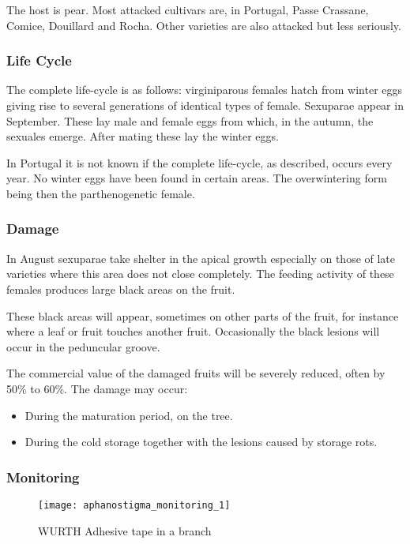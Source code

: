  The host is pear. Most attacked cultivars are, in Portugal, Passe Crassane, Comice, Douillard and Rocha. Other varieties are also attacked but less seriously.

\subsubsection{Life Cycle}

The complete life-cycle is as follows: virginiparous females hatch from winter eggs giving rise to several generations of identical types of female. Sexuparae appear in September. These lay male and female eggs from which, in the autumn, the sexuales emerge. After mating these lay the winter eggs.

In Portugal it is not known if the complete life-cycle, as described, occurs every year. No winter eggs have been found in certain areas. The overwintering form being then the parthenogenetic female.

\subsubsection{Damage}
In August sexuparae take shelter in the apical growth especially on those of late varieties where this area does not close completely. The feeding activity of these females produces large black areas on the fruit.

These black areas will appear, sometimes on other parts of the fruit, for instance where a leaf or fruit touches another fruit. Occasionally the black lesions will occur in the peduncular groove.

The commercial value of the damaged fruits will be severely reduced, often by 50\% to 60\%. The damage may occur:
\begin{itemize}
	\item During the maturation period, on the tree.
	\item During the cold storage together with the lesions caused by storage rots.
\end{itemize}

\subsubsection{Monitoring}

\begin{figure}[htbp]
  \centering
  \texttt{[image: aphanostigma\_monitoring\_1]}
  \caption{WURTH Adhesive tape in a branch}
  \label{fig:aphanostigma_monitoring}
\end{figure}

